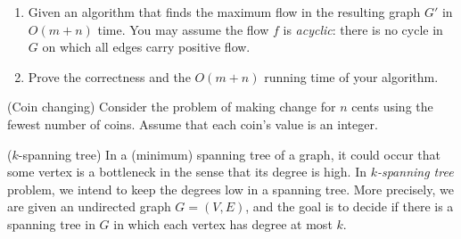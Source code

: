 \documentclass[12pt,answers,addpoints]{exam}
\begin{document}
\begin{questions}
\begin{parts}
    \begin{enumerate}[label=\roman*)]
    \item Given an algorithm that finds the maximum flow in the
      resulting graph $G'$ in $O(m+n)$ time. You may assume the flow
      $f$ is \emph{acyclic}: there is no cycle in $G$ on which all
      edges carry positive flow.

      \vskip 8cm
    \item Prove the correctness and the $O(m+n)$ running time of your
      algorithm.
    \end{enumerate}
  \end{parts}
  \newpage

\question (Coin changing) Consider the problem of making change for
  $n$ cents using the fewest number of coins. Assume that each coin’s
  value is an integer. 

\newpage
  

\question ($k$-spanning tree) In a (minimum) spanning tree of a graph,
  it could occur that some vertex is a bottleneck in the sense that
  its degree is high. In \emph{$k$-spanning tree} problem, we intend
  to keep the degrees low in a spanning tree. More precisely, we are
  given an undirected graph $G=(V,E)$, and the goal is to decide if
  there is a spanning tree in $G$ in which each vertex has degree at
  most $k$.


\end{questions}
\end{document}

